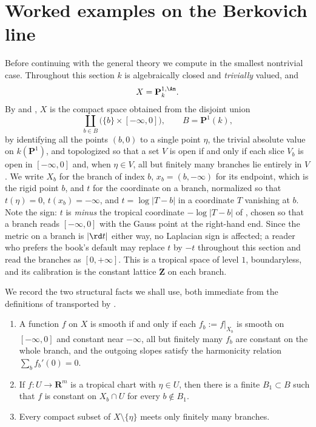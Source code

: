 \section{Worked examples on the Berkovich line}
\label{sec:ch14-line-examples}

Before continuing with the general theory we compute in the smallest
nontrivial case.  Throughout this section $k$ is algebraically closed and
\emph{trivially} valued, and
\[
 X=\mathbf P^{1,\An}_k .
\]
By  and , $X$ is the compact space
obtained from the disjoint union
\[
 \coprod_{b\in B}\bigl(\{b\}\times[-\infty,0]\bigr),
 \qquad B=\mathbf P^1(k),
\]
by identifying all the points $(b,0)$ to a single point $\eta$, the trivial
absolute value on $k(\mathbf P^1)$, and topologized so that a set $V$ is open
if and only if each slice $V_b$ is open in $[-\infty,0]$ and, when
$\eta\in V$, all but finitely many branches lie entirely in $V$.  We write
$X_b$ for the branch of index $b$, $x_b=(b,-\infty)$ for its endpoint, which
is the rigid point $b$, and $t$ for the coordinate on a branch, normalized so
that $t(\eta)=0$, $t(x_b)=-\infty$, and $t=\log|T-b|$ in a coordinate $T$
vanishing at $b$.  Note the sign: $t$ is \emph{minus} the tropical coordinate
$-\log|T-b|$ of , chosen so that a branch reads
$[-\infty,0]$ with the Gauss point at the right-hand end.  Since the metric on
a branch is $|\rd t|$ either way, no Laplacian sign is affected; a reader who
prefers the book's default may replace $t$ by $-t$ throughout this section and
read the branches as $[0,+\infty]$.
This is a tropical space of level $1$, boundaryless, and its calibration is
the constant lattice $\mathbf Z$ on each branch.

We record the two structural facts we shall use, both immediate from the
definitions of  transported by
.

\begin{lemma}
\label{lem:ch14-star-smooth}
\begin{enumerate}
\item A function $f$ on $X$ is smooth if and only if each $f_b:=f|_{X_b}$ is
  smooth on $[-\infty,0]$ and constant near $-\infty$, all but finitely many
  $f_b$ are constant on the whole branch, and the outgoing slopes satisfy the
  harmonicity relation $\sum_bf_b'(0)=0$.
\item If $f:U\to\mathbf R^m$ is a tropical chart with $\eta\in U$, then there
  is a finite $B_1\subset B$ such that $f$ is constant on $X_b\cap U$ for
  every $b\notin B_1$.
\item Every compact subset of $X\setminus\{\eta\}$ meets only finitely many
  branches.
\end{enumerate}
\end{lemma}

